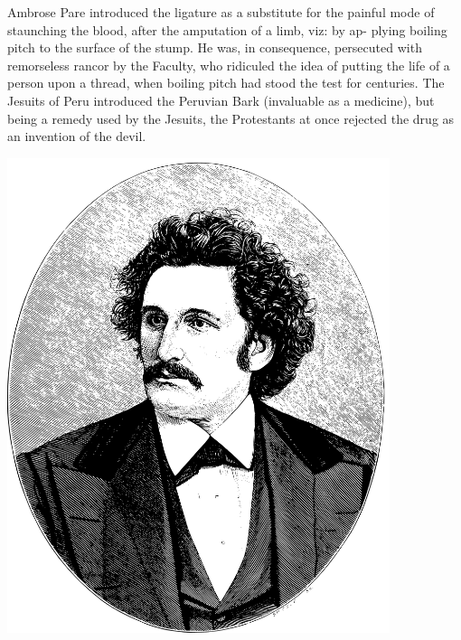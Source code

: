 \documentclass[10pt]{article}
\begin{document}
\begin{multicols}{3}
Ambrose Pare introduced the ligature as a substitute for the painful\linebreak
mode of staunching the blood, after the amputation of a limb, viz: by ap-\linebreak
plying boiling pitch to the surface of the stump. He was, in consequence,\linebreak
persecuted with remorseless rancor by the Faculty, who ridiculed the idea\linebreak
of putting the life of a person upon a thread, when boiling pitch had stood\linebreak
the test for centuries. The Jesuits of Peru introduced the Peruvian\linebreak
Bark (invaluable as a medicine), but being a remedy used by the Jesuits,\linebreak
the Protestants at once rejected the drug as an invention of the devil.

\vspace{5mm}

\begin{centering}
\hspace{2mm}\includegraphics[width=112mm]{C_L_Blood.pdf}

\vspace{2mm}


\end{centering}
\end{multicols}
\end{document}

